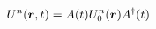 \begin{equation}
U^n(\mbox{\boldmath$r$},t)=A(t) U_0^n(\mbox{\boldmath$r$}) A^\dag(t)
\end{equation} 
